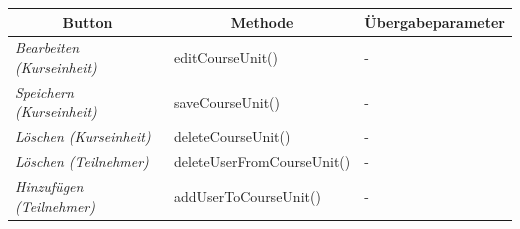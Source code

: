 \begin{itemize}
\begin{center}
\begin{longtable}{|p{4cm} |p{6cm} | p{4cm}|}
						\hline \multicolumn{1}{|c|}{\textbf{Button}} & \multicolumn{1}{|c|}{\textbf{Methode}} & \multicolumn{1}{|c|}{\textbf{\"{U}bergabeparameter}} \\ \hline
						\endfirsthead
						\hline
						\endlastfoot
						
							\textit{Bearbeiten (Kurseinheit) } & editCourseUnit() & - \\ \hline
							\textit{Speichern (Kurseinheit) } & saveCourseUnit() & - \\ \hline
							\textit{Löschen (Kurseinheit) } & deleteCourseUnit() & - \\ \hline
							\textit{Löschen (Teilnehmer) } & deleteUserFromCourseUnit() & - \\ \hline
							\textit{Hinzufügen (Teilnehmer) } & addUserToCourseUnit() & - \\ \hline
					\end{longtable}
				\end{center}
				

\end{itemize}
